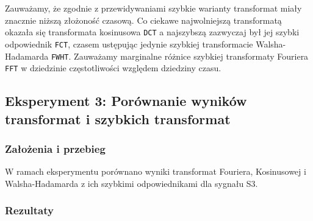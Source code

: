 \documentclass[12pt]{article}
\begin{document}
Zauważamy, że zgodnie z przewidywaniami szybkie warianty transformat miały znacznie niższą złożoność czasową. Co ciekawe najwolniejszą transformatą okazała się transformata kosinusowa \verb|DCT| a najszybszą zazwyczaj był jej szybki odpowiednik \verb|FCT|, czasem ustępując jedynie szybkiej transformacie Walsha-Hadamarda \verb|FWHT|. Zauważamy marginalne różnice szybkiej transformaty Fouriera \verb|FFT| w dziedzinie częstotliwości względem dziedziny czasu.

\subsection{Eksperyment 3: Porównanie wyników transformat i szybkich transformat}
\subsubsection{Założenia i przebieg}
W ramach eksperymentu porównano wyniki transformat Fouriera, Kosinusowej i Walsha-Hadamarda z ich szybkimi odpowiednikami dla sygnału S3.

\subsubsection{Rezultaty}
\end{document}
